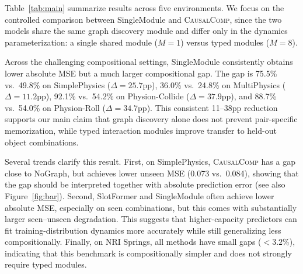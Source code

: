 \documentclass{article}
\newcommand{\ours}{\textsc{CausalComp}}
\begin{document}
Table~\ref{tab:main} summarize results across five environments. We focus on the controlled comparison between SingleModule and \ours{}, since the two models share the same graph discovery module and differ only in the dynamics parameterization: a single shared module ($M{=}1$) versus typed modules ($M{=}8$).

Across the challenging compositional settings, SingleModule consistently obtains lower absolute MSE but a much larger compositional gap. The gap is 75.5\% vs.\ 49.8\% on SimplePhysics ($\Delta=25.7$pp), 36.0\% vs.\ 24.8\% on MultiPhysics ($\Delta=11.2$pp), 92.1\% vs.\ 54.2\% on Physion-Collide ($\Delta=37.9$pp), and 88.7\% vs.\ 54.0\% on Physion-Roll ($\Delta=34.7$pp). This consistent 11--38pp reduction supports our main claim that graph discovery alone does not prevent pair-specific memorization, while typed interaction modules improve transfer to held-out object combinations.

Several trends clarify this result. First, on SimplePhysics, \ours{} has a gap close to NoGraph, but achieves lower unseen MSE (0.073 vs.\ 0.084), showing that the gap should be interpreted together with absolute prediction error (see also Figure~\ref{fig:bar}). Second, SlotFormer and SingleModule often achieve lower absolute MSE, especially on seen combinations, but this comes with substantially larger seen--unseen degradation. This suggests that higher-capacity predictors can fit training-distribution dynamics more accurately while still generalizing less compositionally. Finally, on NRI Springs, all methods have small gaps ($<3.2\%$), indicating that this benchmark is compositionally simpler and does not strongly require typed modules.


\end{document}
